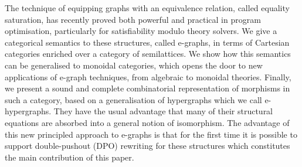 The technique of equipping graphs with an equivalence relation, called equality saturation, has recently proved both powerful and practical in program optimisation, particularly for satisfiability modulo theory solvers. 
We give a categorical semantics to these structures, called e-graphs, in terms of Cartesian categories enriched over a category of semilattices.
We show how this semantics can be generalised to monoidal categories, which opens the door to new applications of e-graph techniques, from algebraic to monoidal theories.
Finally, we present a sound and complete combinatorial representation of morphisms in such a category,  based on a generalisation of hypergraphs which we call e-hypergraphs.
They have the usual advantage that many of their structural equations are absorbed into a general notion of isomorphism. 
The advantage of this new principled approach to e-graphs is that for the first time it is possible to support double-pushout (DPO) rewriting for these structures which constitutes the main contribution of this paper.